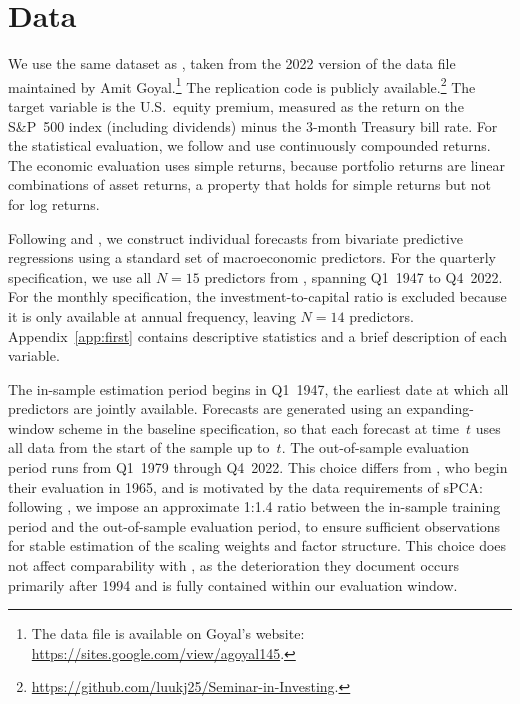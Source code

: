 \documentclass[a4paper,11pt]{article}
\begin{document}
\section{Data}\label{sec:data}

We use the same dataset as \citet{denkloffler2024}, taken from the 2022
version of the data file maintained by Amit
Goyal.\footnote{The data file is available on Goyal's website:
\href{https://sites.google.com/view/agoyal145}{https://sites.google.com/view/agoyal145}.}
The replication code is publicly
available.\footnote{\href{https://github.com/luukj25/Seminar-in-Investing}{https://github.com/luukj25/Seminar-in-Investing}.}
The target variable is the U.S.\ equity premium, measured as the return on
the S\&P~500 index (including dividends) minus the 3-month Treasury bill
rate. For the statistical evaluation, we follow \citet{denkloffler2024}
and use continuously compounded returns. The economic evaluation uses
simple returns, because portfolio returns are linear combinations of
asset returns, a property that holds for simple returns but not for log
returns.

Following \citet{rsz2010} and \citet{denkloffler2024}, we construct
individual forecasts from bivariate predictive regressions using a
standard set of macroeconomic predictors. For the quarterly specification,
we use all $N = 15$ predictors from \citet{rsz2010}, spanning Q1~1947 to
Q4~2022. For the monthly specification, the investment-to-capital ratio
is excluded because it is only available at annual frequency, leaving
$N = 14$ predictors. Appendix~\ref{app:first} contains descriptive
statistics and a brief description of each variable.

The in-sample estimation period begins in Q1~1947, the earliest date at
which all predictors are jointly available. Forecasts are generated using
an expanding-window scheme in the baseline specification, so that each
forecast at time~$t$ uses all data from the start of the sample up to~$t$.
The out-of-sample evaluation period runs from Q1~1979 through Q4~2022.
This choice differs from \citet{denkloffler2024}, who begin their
evaluation in 1965, and is motivated by the data requirements of sPCA:
following \citet{huang2022scale}, we impose an approximate 1:1.4 ratio
between the in-sample training period and the out-of-sample evaluation
period, to ensure sufficient observations for stable estimation of the
scaling weights and factor structure. This choice does not affect
comparability with \citet{denkloffler2024}, as the deterioration they
document occurs primarily after 1994 and is fully contained within our
evaluation window.
\end{document}
